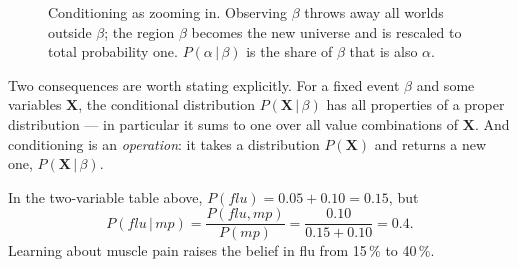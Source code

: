\documentclass[11pt, oneside]{book}
\newcommand{\Prob}{\mathbb{P}}           %
\newcommand{\given}{\,\vert\,}           %
\newcommand{\bX}{\mathbf{X}}  \newcommand{\bY}{\mathbf{Y}}
\newcommand{\vn}[1]{\mathit{#1}}         %
\begin{document}
\begin{figure}[htbp]
\centering
{}
\caption{Conditioning as zooming in. Observing $\beta$ throws away all worlds
outside $\beta$; the region $\beta$ becomes the new universe and is rescaled
to total probability one. $P(\alpha \given \beta)$ is the share of $\beta$
that is also $\alpha$.}
\label{fig:conditioning}
\end{figure}

Two consequences are worth stating explicitly. For a fixed event $\beta$ and
some variables $\bX$, the conditional distribution $P(\bX \given \beta)$ has
all properties of a proper distribution --- in particular it sums to one over
all value combinations of $\bX$. And conditioning is an \emph{operation}: it
takes a distribution $P(\bX)$ and returns a new one, $P(\bX \given \beta)$.

In the two-variable table above, $P(\vn{flu}) = 0.05 + 0.10 = 0.15$, but
\[
P(\vn{flu} \given \vn{mp}) = \frac{P(\vn{flu}, \vn{mp})}{P(\vn{mp})}
= \frac{0.10}{0.15 + 0.10} = 0.4 .
\]
Learning about muscle pain raises the belief in flu from 15\,\% to 40\,\%.
\end{document}
